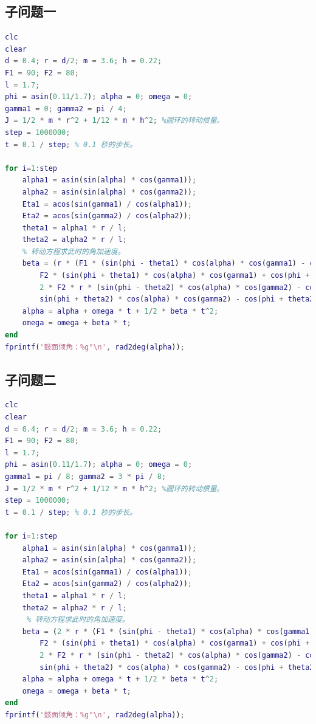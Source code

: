 \documentclass{cumcm}
\begin{document}
\subsection{子问题一}
\begin{lstlisting}[language=matlab]
clc
clear
d = 0.4; r = d/2; m = 3.6; h = 0.22;
F1 = 90; F2 = 80;
l = 1.7;
phi = asin(0.11/1.7); alpha = 0; omega = 0;
gamma1 = 0; gamma2 = pi / 4;
J = 1/2 * m * r^2 + 1/12 * m * h^2; %圆环的转动惯量。
step = 1000000;
t = 0.1 / step; % 0.1 秒的步长。

for i=1:step
    alpha1 = asin(sin(alpha) * cos(gamma1));
    alpha2 = asin(sin(alpha) * cos(gamma2));
    Eta1 = acos(sin(gamma1) / cos(alpha1));
    Eta2 = acos(sin(gamma2) / cos(alpha2));
    theta1 = alpha1 * r / l;
    theta2 = alpha2 * r / l;
    % 转动方程求此时的角加速度。
    beta = (r * (F1 * (sin(phi - theta1) * cos(alpha) * cos(gamma1) - cos(phi - theta1) * sin(alpha1) * sin(Eta1)) - ...
        F2 * (sin(phi + theta1) * cos(alpha) * cos(gamma1) + cos(phi + theta1) * sin(alpha1) * sin(Eta1))) + ...
        2 * F2 * r * (sin(phi - theta2) * cos(alpha) * cos(gamma2) - cos(phi - theta2) * sin(alpha2) * sin(Eta2) - ...
        sin(phi + theta2) * cos(alpha) * cos(gamma2) - cos(phi + theta2) * sin(alpha2) * sin(Eta2))) / J;
    alpha = alpha + omega * t + 1/2 * beta * t^2;
    omega = omega + beta * t;
end
fprintf('鼓面倾角：%g°\n', rad2deg(alpha));
\end{lstlisting}

\subsection{子问题二}
\begin{lstlisting}[language=matlab]
clc
clear
d = 0.4; r = d/2; m = 3.6; h = 0.22;
F1 = 90; F2 = 80;
l = 1.7;
phi = asin(0.11/1.7); alpha = 0; omega = 0;
gamma1 = pi / 8; gamma2 = 3 * pi / 8;
J = 1/2 * m * r^2 + 1/12 * m * h^2; %圆环的转动惯量。
step = 1000000;
t = 0.1 / step; % 0.1 秒的步长。

for i=1:step
    alpha1 = asin(sin(alpha) * cos(gamma1));
    alpha2 = asin(sin(alpha) * cos(gamma2));
    Eta1 = acos(sin(gamma1) / cos(alpha1));
    Eta2 = acos(sin(gamma2) / cos(alpha2));
    theta1 = alpha1 * r / l;
    theta2 = alpha2 * r / l;
     % 转动方程求此时的角加速度。
    beta = (2 * r * (F1 * (sin(phi - theta1) * cos(alpha) * cos(gamma1) - cos(phi - theta1) * sin(alpha1) * sin(Eta1)) - ...
        F2 * (sin(phi + theta1) * cos(alpha) * cos(gamma1) + cos(phi + theta1) * sin(alpha1) * sin(Eta1))) + ...
        2 * F2 * r * (sin(phi - theta2) * cos(alpha) * cos(gamma2) - cos(phi - theta2) * sin(alpha2) * sin(Eta2) - ...
        sin(phi + theta2) * cos(alpha) * cos(gamma2) - cos(phi + theta2) * sin(alpha2) * sin(Eta2))) / J;
    alpha = alpha + omega * t + 1/2 * beta * t^2;
    omega = omega + beta * t;
end
fprintf('鼓面倾角：%g°\n', rad2deg(alpha));
\end{lstlisting}
\end{document}
